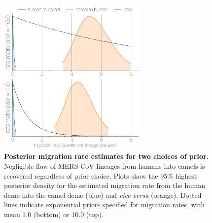 \documentclass[11pt,oneside,letterpaper]{article}
\begin{document}
\begin{figure}[h]
\centering
	\includegraphics[width=0.65\textwidth]{figures/mers_prior.png}
	\caption{\textbf{Posterior migration rate estimates for two choices of prior.}
Negligible flow of MERS-CoV lineages from humans into camels is recovered regardless of prior choice.
Plots show the 95\% highest posterior density for the estimated migration rate from the human deme into the camel deme (blue) and \textit{vice versa} (orange).
Dotted lines indicate exponential priors specified for migration rates, with mean 1.0 (bottom) or 10.0 (top).
	}
	\label{prior}
\end{figure}
\end{document}
